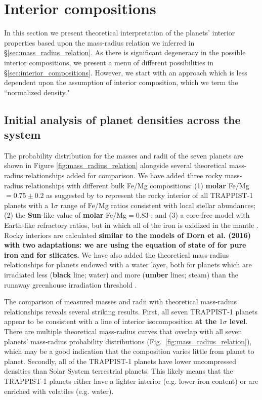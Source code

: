 \documentclass[twocolumn]{aastex63}
\begin{document}
\section{Interior compositions}
\label{sec:theoretical_interpretation}

In this section we present theoretical interpretation of the planets'
interior properties based upon the mass-radius relation we inferred in \S \ref{sec:mass_radius_relation}.  As there is significant degeneracy in the possible interior compositions, we present a menu of different possibilities in \S \ref{sec:interior_compositions}.  However, we start with an approach which is less dependent upon the assumption of interior composition, which we term the ``normalized density."

\subsection{Initial analysis of planet densities across the system}

The probability distribution for the masses and radii of the seven planets are shown in Figure \ref{fig:mass_radius_relation} alongside several theoretical mass-radius relationships added for comparison.
We have added three rocky mass-radius relationships with different bulk Fe/Mg compositions:  (1) \textbf{molar}  Fe/Mg$ =0.75{\pm} 0.2$ as suggested by \citet{Unterborn2018a} to represent the rocky interior of all TRAPPIST-1 planets with a 1$\sigma$ range of Fe/Mg ratios consistent with local stellar abundances;  (2) the \textbf{Sun}-like value of \textbf{molar} Fe/Mg$ = 0.83$ \citep{Lodders2009}; and (3) a core-free model with Earth-like refractory ratios, but in which all of the iron is oxidized in the mantle \citep{ElkinsTanton2008}. Rocky interiors are calculated \textbf{similar to the models of Dorn et al. (2016) with two adaptations: we are using the equation of state of \citet{Hakim2018} for pure iron and \citet{Sotin2007} for silicates.} We have also added the theoretical mass-radius relationships for planets endowed with a water layer, both for planets which are irradiated less (\textbf{black} line; water) and more (\textbf{umber} lines; steam) than the runaway greenhouse irradiation threshold \citep{Turbet2020}.

The comparison of measured masses and radii with theoretical mass-radius relationships reveals several striking results. First, all seven TRAPPIST-1 planets appear to be consistent with a line of interior isocomposition \textbf{at the $1\sigma$ level}. There are multiple theoretical mass-radius curves that overlap with all seven planets' mass-radius probability distributions (Fig.\ \ref{fig:mass_radius_relation}), which may be a good indication that the composition varies little from planet to planet. Secondly, all of the TRAPPIST-1 planets have lower uncompressed densities than Solar System terrestrial planets. This likely means that the TRAPPIST-1 planets either have a lighter interior (e.g. lower iron content) or are enriched with volatiles (e.g. water).
\end{document}
